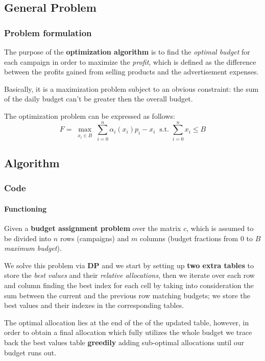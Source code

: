 
\subsection{General Problem}


\begin{frame}

\frametitle{Problem formulation}

The purpose of the \textbf{optimization algorithm} is to find the \textit{optimal budget} for each campaign in order to maximize the \textit{profit}, which is defined as the difference between the profits gained from selling products and the advertisement expenses.

Basically, it is a maximization problem subject to an obvious constraint: the sum of the daily budget can't be greater then the overall budget.

The optimization problem can be expressed as follows:
\begin{displaymath}
	F=\max_{\substack{x_i\in B}} \sum_{i=0}^n \alpha_i(x_i)p_i-x_i ~\text{  s.t.  } \sum_{i=0}^n x_i\leq B
\end{displaymath}

\end{frame}


\subsection{Algorithm}


\begin{frame}

\frametitle{Code}
\framesubtitle{Functioning}

\vspace*{-1em}

Given a \textbf{budget assignment problem} over the matrix $c$, which is assumed to be divided into $n$ rows (campaigns) and $m$ columns (budget fractions from 0 to $B$ \textit{maximum budget}).

We solve this problem via \textbf{DP} and we start by setting up \textbf{two extra tables} to store the \textit{best values} and their \textit{relative allocations}, then we iterate over each row and column finding the best index for each cell by taking into consideration the sum between the current and the previous row matching budgets; we store the best values and their indexes in the corresponding tables.

The optimal allocation lies at the end of the of the updated table, however, in order to obtain a final allocation which fully utilizes the whole budget we trace back the best values table \textbf{greedily} adding sub-optimal allocations until our budget runs out.

\end{frame}

